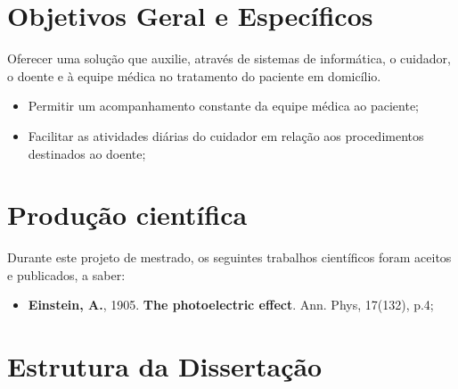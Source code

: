 \section{Objetivos Geral e Específicos}\label{sec:objetivos}

Oferecer uma solução que auxilie, através de sistemas de informática, o 
cuidador, o doente e à equipe médica no tratamento do paciente em domicílio.


\begin{itemize}
  \item Permitir um acompanhamento constante da equipe médica ao paciente;
  \item Facilitar as atividades diárias do cuidador em relação aos procedimentos
  destinados ao doente;
\end{itemize}

\section{Produção científica}\label{sec:producao}  

Durante este projeto de mestrado, os seguintes trabalhos científicos foram
aceitos e publicados, a saber:

\begin{itemize}
	\item \textbf{Einstein, A.}, 1905. \textbf{The photoelectric effect}. Ann. Phys, 17(132), p.4;
\end{itemize}

\section{Estrutura da Dissertação}\label{sec:estrutura}
